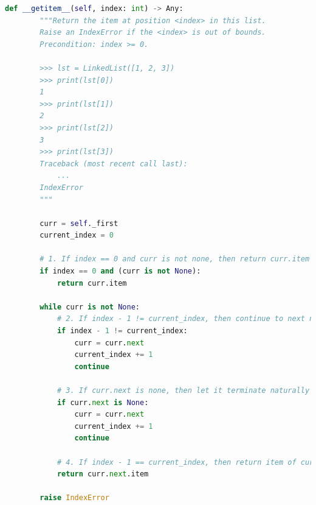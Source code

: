 \documentclass[12pt]{article}
\begin{document}
\bigskip

\begin{lstlisting}[language=Python,caption={worksheet\_13\_q2\_solution.py},captionpos=b]
    def __getitem__(self, index: int) -> Any:
        """Return the item at position <index> in this list.
        Raise an IndexError if the <index> is out of bounds.
        Precondition: index >= 0.

        >>> lst = LinkedList([1, 2, 3])
        >>> print(lst[0])
        1
        >>> print(lst[1])
        2
        >>> print(lst[2])
        3
        >>> print(lst[3])
        Traceback (most recent call last):
            ...
        IndexError
        """

        curr = self._first
        current_index = 0

        # 1. If index == 0 and curr is not none, then return curr.item (edge case)
        if index == 0 and (curr is not None):
            return curr.item

        while curr is not None:
            # 2. If index - 1 != current_index, then continue to next node
            if index - 1 != current_index:
                curr = curr.next
                current_index += 1
                continue

            # 3. If curr.next is none, then let it terminate naturally
            if curr.next is None:
                curr = curr.next
                current_index += 1
                continue

            # 4. If index - 1 == current_index, then return item of curr.next
            return curr.next.item

        raise IndexError
\end{lstlisting}
\end{document}
